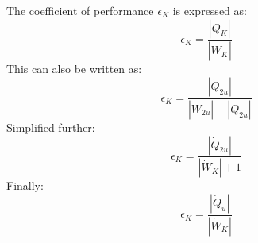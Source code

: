 The coefficient of performance \( \epsilon_K \) is expressed as:  
\[
\epsilon_K = \frac{|\dot{Q}_K|}{|\dot{W}_K|}
\]  
This can also be written as:  
\[
\epsilon_K = \frac{|\dot{Q}_{2u}|}{|\dot{W}_{2u}| - |\dot{Q}_{2u}|}
\]  
Simplified further:  
\[
\epsilon_K = \frac{|\dot{Q}_{2u}|}{|\dot{W}_K| + 1}
\]  
Finally:  
\[
\epsilon_K = \frac{|\dot{Q}_u|}{|\dot{W}_K|}
\]